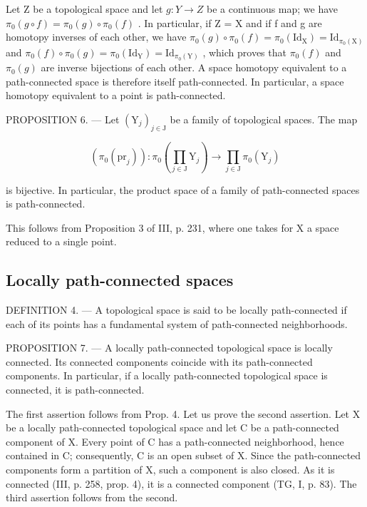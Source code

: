 Let Z be a topological space and let \(g: Y \to Z\) be a continuous map; we have \(\pi_{0}(g \circ f) = \pi_{0}(g) \circ \pi_{0}(f)\) . In particular, if Z = X and if f and g are homotopy inverses of each other, we have \(\pi_{0}(g) \circ \pi_{0}(f) = \pi_{0}(\mathrm{Id}_{\mathrm{X}}) = \mathrm{Id}_{\pi_{0}(\mathrm{X})}\) and \(\pi_{0}(f) \circ \pi_{0}(g) = \pi_{0}(\mathrm{Id}_{\mathrm{Y}}) = \mathrm{Id}_{\pi_{0}(\mathrm{Y})}\) , which proves that \(\pi_{0}(f)\) and \(\pi_{0}(g)\) are inverse bijections of each other. A space homotopy equivalent to a path-connected space is therefore itself path-connected. In particular, a space homotopy equivalent to a point is path-connected.

PROPOSITION 6. --- Let \((\mathrm{Y}_{j})_{j\in\mathrm{J}}\) be a family of topological spaces. The map

\[
(\pi_ {0} (\mathrm{pr} _ {j})) \colon \pi_ {0} (\prod_ {j \in \mathrm{J}} \mathrm{Y} _ {j}) \to \prod_ {j \in \mathrm{J}} \pi_ {0} (\mathrm{Y} _ {j})
\]

is bijective. In particular, the product space of a family of path-connected spaces is path-connected.

This follows from Proposition 3 of III, p. 231, where one takes for X a space reduced to a single point.

\subsection{Locally path-connected spaces}

DEFINITION 4. --- A topological space is said to be locally path-connected if each of its points has a fundamental system of path-connected neighborhoods.

PROPOSITION 7. --- A locally path-connected topological space is locally connected. Its connected components coincide with its path-connected components. In particular, if a locally path-connected topological space is connected, it is path-connected.

The first assertion follows from Prop. 4. Let us prove the second assertion. Let X be a locally path-connected topological space and let C be a path-connected component of X. Every point of C has a path-connected neighborhood, hence contained in C; consequently, C is an open subset of X. Since the path-connected components form a partition of X, such a component is also closed. As it is connected (III, p. 258, prop. 4), it is a connected component (TG, I, p. 83). The third assertion follows from the second.

